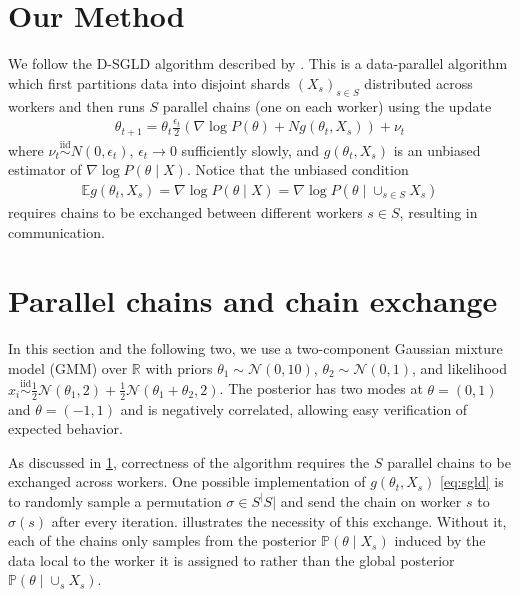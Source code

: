 \documentclass{article}
\newcommand{\ex}{\mathbb{E}}
\newcommand{\pr}{\mathbb{P}}
\begin{document}
\section{Our Method}
\label{sec:our-method}

We follow the D-SGLD algorithm described by \citet{ahn2014distributed}. This is a data-parallel
algorithm which first partitions data into disjoint shards $(X_s)_{s \in S}$ distributed across
workers and then runs $S$ parallel chains (one on each worker) using the update
\begin{align}
  \theta_{t+1} = \theta_t \frac{\epsilon_t}{2}\left( \nabla \log P(\theta) + N g(\theta_t, X_s) \right) + \nu_t
\end{align}
where $\nu_t \overset{\text{iid}}{\sim} N(0, \epsilon_t)$, $\epsilon_t \to 0$ sufficiently slowly, and
$g(\theta_t, X_s)$ is an unbiased estimator of $\nabla \log P(\theta \mid X)$.
Notice that the unbiased condition
\begin{align}
  \label{eq:sgld}
  \ex g(\theta_t, X_s) = \nabla \log P(\theta \mid X) = \nabla \log P(\theta \mid \cup_{s \in S} X_s)
\end{align}
requires chains to be exchanged between different workers $s \in S$, resulting
in communication.

\section{Parallel chains and chain exchange}

In this section and the following two, we use a two-component Gaussian mixture model (GMM)
over $\mathbb{R}$ with priors $\theta_1 \sim \mathcal{N}(0,10)$, $\theta_2 \sim \mathcal{N}(0,1)$,
and likelihood
$x_i \overset{\text{iid}}{\sim} \frac{1}{2}\mathcal{N}(\theta_1, 2) + \frac{1}{2}\mathcal{N}(\theta_1 + \theta_2, 2)$.
The posterior has two modes at $\theta = (0,1)$ and $\theta = (-1,1)$ and is negatively correlated,
allowing easy verification of expected behavior.

As discussed in \cref{sec:our-method}, correctness of the algorithm requires
the $S$ parallel chains to be exchanged across workers. One possible
implementation of $g(\theta_t, X_s)$ \cref{eq:sgld} is to randomly sample a
permutation $\sigma \in S^\lvert S \rvert$ and send the chain on worker $s$ to
$\sigma(s)$ after every iteration.  illustrates the necessity of this
exchange. Without it, each of the chains only samples from the posterior $\pr(\theta \mid X_s)$
induced by the data local to the worker it is assigned to rather than the global posterior
$\pr(\theta \mid \cup_s X_s)$.
\end{document}
